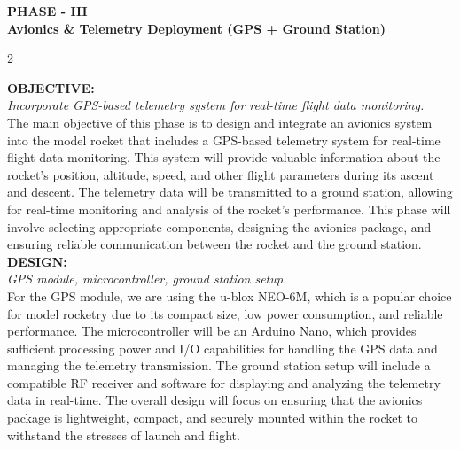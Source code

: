 \documentclass[10pt]{report}
\begin{document}
  \newpage
  \begin{center}
    \textbf{\LARGE PHASE - III} \\
    \vspace{0.2cm}
    \textbf{\Large Avionics \& Telemetry Deployment (GPS + Ground Station)}
  \end{center}
  \begin{multicols}{2}
      

  \noindent \textbf{\large OBJECTIVE:} \\ \textit{Incorporate GPS-based telemetry system for real-time flight data monitoring.} \\

  The main objective of this phase is to design and integrate an avionics system into the model rocket that includes a GPS-based telemetry system for real-time flight data monitoring. This system will provide valuable information about the rocket's position, altitude, speed, and other flight parameters during its ascent and descent. The telemetry data will be transmitted to a ground station, allowing for real-time monitoring and analysis of the rocket's performance. This phase will involve selecting appropriate components, designing the avionics package, and ensuring reliable communication between the rocket and the ground station. \\

  \noindent \textbf{\large DESIGN:}\\  \textit{GPS module, microcontroller, ground station setup.}\\
  For the GPS module, we are using the u-blox NEO-6M, which is a popular choice for model rocketry due to its compact size, low power consumption, and reliable performance. The microcontroller will be an Arduino Nano, which provides sufficient processing power and I/O capabilities for handling the GPS data and managing the telemetry transmission. The ground station setup will include a compatible RF receiver and software for displaying and analyzing the telemetry data in real-time. The overall design will focus on ensuring that the avionics package is lightweight, compact, and securely mounted within the rocket to withstand the stresses of launch and flight. \\


\end{multicols}
\end{document}
